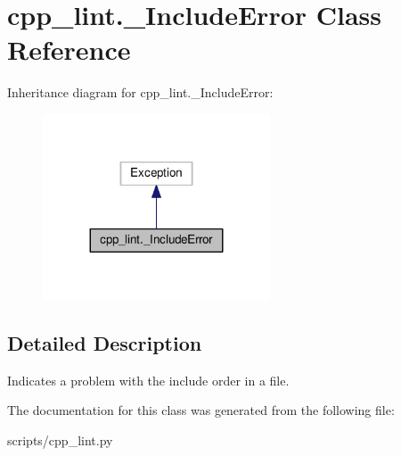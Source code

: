 \hypertarget{classcpp__lint_1_1___include_error}{}\section{cpp\+\_\+lint.\+\_\+\+Include\+Error Class Reference}
\label{classcpp__lint_1_1___include_error}


Inheritance diagram for cpp\+\_\+lint.\+\_\+\+Include\+Error\+:
\nopagebreak
\begin{figure}[H]
\begin{center}
\leavevmode
\includegraphics[width=191pt]{classcpp__lint_1_1___include_error__inherit__graph}
\end{center}
\end{figure}


\subsection{Detailed Description}
\begin{DoxyVerb}Indicates a problem with the include order in a file.\end{DoxyVerb}
 

The documentation for this class was generated from the following file\+:\begin{DoxyCompactItemize}
\item 
scripts/cpp\+\_\+lint.\+py\end{DoxyCompactItemize}
